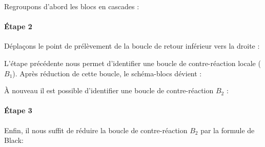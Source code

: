 Regroupons d'abord les blocs en cascades :

\begin{center}
    
\end{center}

\paragraph{\'Etape 2}

Déplaçons le point de prélèvement de la boucle de retour inférieur vers 
la droite  : 

\begin{center}
    
\end{center}
L'étape précédente nous permet d'identifier une boucle de contre-réaction 
locale ($B_1$). Après réduction de cette boucle, le schéma-blocs dévient : 

\begin{center}
    
\end{center}

\`A nouveau il est possible d'identifier une boucle de contre-réaction $B_2$ :

\begin{center}
    
\end{center}

\paragraph{\'Etape 3}

Enfin, il nous suffit de réduire la boucle de contre-réaction $B_2$ par la 
formule de Black:

\begin{center}
    
\end{center}

